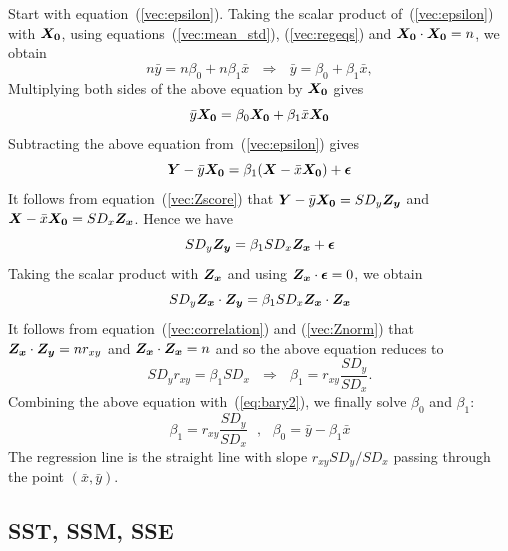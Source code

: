 \documentclass[11pt]{article}
\newcommand{\beq}{\begin{equation}}
\newcommand{\eeq}{\end{equation}}
\newcommand{\ve}[1]{\mbox{\boldmath $#1$}}
\begin{document}
Start with equation~(\ref{vec:epsilon}). Taking the scalar product of~(\ref{vec:epsilon}) with 
$\ve{X_0}$, using equations~(\ref{vec:mean_std}), (\ref{vec:regeqs}) and $\ve{X_0}\cdot \ve{X_0}=n$, we obtain 
\beq
  n\bar{y} = n \beta_0 + n \beta_1 \bar{x} \ \ \ \Rightarrow \ \ \ 
  \bar{y} = \beta_0 + \beta_1 \bar{x} ,
\label{eq:bary2}
\eeq
Multiplying both sides of the above equation by 
$\ve{X_0}$ gives 
\[
  \bar{y} \ve{X_0} = \beta_0 \ve{X_0} + \beta_1 \bar{x} \ve{X_0} 
\]
Subtracting the above equation from~(\ref{vec:epsilon}) gives 
\[
  \ve{Y}-\bar{y} \ve{X_0} = \beta_1 (\ve{X}-\bar{x} \ve{X_0}) + \ve{\epsilon} 
\]
It follows from equation~(\ref{vec:Zscore}) that $\ve{Y}-\bar{y} \ve{X_0} = SD_y \ve{Z_y}$ 
and $\ve{X}-\bar{x} \ve{X_0} = SD_x \ve{Z_x}$.
Hence we have 
\[
  SD_y \ve{Z_y} = \beta_1 SD_x \ve{Z_x} + \ve{\epsilon} 
\]
Taking the scalar product with $\ve{Z_x}$ and using $\ve{Z_x} \cdot \ve{\epsilon}=0$, we obtain 
\[
  SD_y \ve{Z_x} \cdot \ve{Z_y} =\beta_1 SD_x \ve{Z_x} \cdot \ve{Z_x} 
\]
It follows from equation~(\ref{vec:correlation}) and (\ref{vec:Znorm}) that 
$\ve{Z_x} \cdot \ve{Z_y}=n r_{xy}$ and $\ve{Z_x} \cdot \ve{Z_x}=n$ and so the 
above equation reduces to 
\[
  SD_y r_{xy} = \beta_1 SD_x \ \ \ \Rightarrow \ \ \ \beta_1 = r_{xy} \frac{SD_y}{SD_x} .
\]
Combining the above equation with~(\ref{eq:bary2}), we finally solve $\beta_0$ and $\beta_1$: 
\beq
  \boxed{ \beta_1 = r_{xy} \frac{SD_y}{SD_x} \ \ \ , \ \ \ 
  \beta_0 = \bar{y}-\beta_1 \bar{x} } 
\label{eq:regcoefs}
\eeq
The regression line is the straight line with slope $r_{xy} SD_y/SD_x$ passing 
through the point $(\bar{x},\bar{y})$.

\subsection{SST, SSM, SSE}
\label{sec:RMSE}
\end{document}
